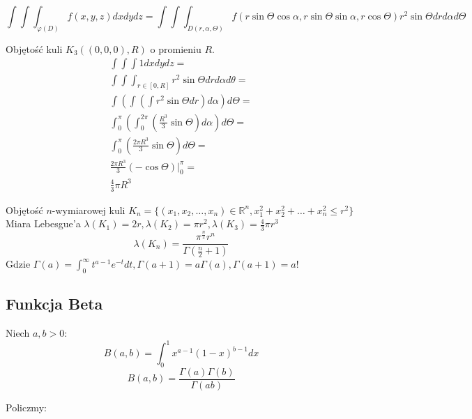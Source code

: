 \documentclass{article}
\theoremstyle{definition}
\theoremstyle{definition}
\theoremstyle{definition}
\theoremstyle{definition}
\begin{document}
\[\int\int\int_{\varphi(D)} f(x,y,z)dxdydz = \int\int\int_{D(r,\alpha,\Theta)} f(r\sin\Theta\cos\alpha, r\sin\Theta\sin\alpha, r\cos\Theta) r^2 \sin\Theta dr d\alpha d\Theta\]

Objętość kuli $K_3((0,0,0),R)$ o promieniu $R$.
\begin{align}
    \int\int\int 1dxdydz =\\
    \int\int\int_{r\in[0,R]} r^2\sin\Theta drd\alpha d\theta =\\
    \int\left(\int\left(\int r^2 \sin\Theta dr\right) d\alpha\right) d\Theta =\\
    \int_{0}^{\pi}\left(\int_{0}^{2\pi} \left(\frac{R^3}{3} \sin\Theta\right) d\alpha\right)d\Theta =\\
    \int_{0}^{\pi}\left(\frac{2\pi R^3}{3} \sin\Theta\right) d\Theta =\\
    \frac{2\pi R^3}{3}(-\cos\Theta)|_{0}^{\pi} =\\
    \frac{4}{3}\pi R^3
\end{align}

Objętość $n$-wymiarowej kuli $K_n=\{(x_1,x_2,\dots,x_n)\in\mathbb{R}^n, x_1^2+x_2^2+\dots+x_n^2 \leq r^2\}$\\
Miara Lebesgue'a $\lambda(K_1)=2r, \lambda(K_2)=\pi r^2, \lambda(K_3)=\frac{4}{3}\pi r^3$
\[\lambda(K_n) = \frac{\pi^{\frac{n}{2}}r^n}{\Gamma(\frac{n}{2}+1)}\]
Gdzie $\Gamma(a)=\int_{0}^{\infty} t^{a-1}e^{-t}dt, \Gamma(a+1)=a\Gamma(a),\Gamma(a+1)=a!$

\subsection{Funkcja Beta}

Niech $a,b>0$:
\[B(a,b)=\int_{0}^{1} x^{a-1} (1-x)^{b-1} dx\]
\[B(a,b)=\frac{\Gamma(a)\Gamma(b)}{\Gamma(ab)}\]

Policzmy:
\end{document}
